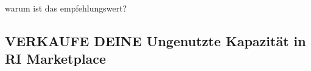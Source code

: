 warum ist das empfehlungswert?

\subsection{VERKAUFE DEINE Ungenutzte Kapazität in RI Marketplace}



 